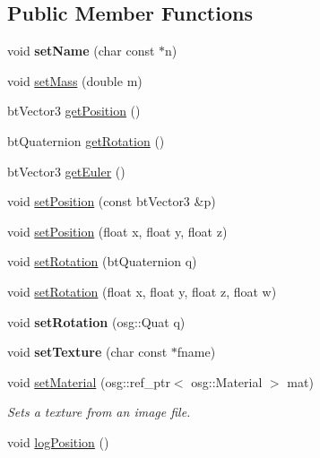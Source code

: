 \subsection*{Public Member Functions}
\begin{DoxyCompactItemize}
\item 
\mbox{\label{classbtosgObject_ab06a1b3f357209214c6440cd5746523e}} 
void {\bfseries set\+Name} (char const $\ast$n)
\item 
void \hyperlink{classbtosgObject_a91da93c82d48b86192f0cbb16054fe57}{set\+Mass} (double m)
\item 
bt\+Vector3 \hyperlink{classbtosgObject_a77a1434498d7a6d00c415042a995d119}{get\+Position} ()
\item 
bt\+Quaternion \hyperlink{classbtosgObject_a9cadb03762699412552601196950a039}{get\+Rotation} ()
\item 
bt\+Vector3 \hyperlink{classbtosgObject_afef1fe06635566ab9cee134f72439e02}{get\+Euler} ()
\item 
void \hyperlink{classbtosgObject_ad0f76df8e8bde6c8a9d1b1d53551172b}{set\+Position} (const bt\+Vector3 \&p)
\item 
void \hyperlink{classbtosgObject_adb9f2cff0faf66dc252cd7c97b11ac84}{set\+Position} (float x, float y, float z)
\item 
void \hyperlink{classbtosgObject_a656412794a971a10478aedb520f298bf}{set\+Rotation} (bt\+Quaternion q)
\item 
void \hyperlink{classbtosgObject_a4d21ca59b944fd26644db35d3e9ba67a}{set\+Rotation} (float x, float y, float z, float w)
\item 
\mbox{\label{classbtosgObject_ae803e0566f0d7b3ffca686b968b297f8}} 
void {\bfseries set\+Rotation} (osg\+::\+Quat q)
\item 
\mbox{\label{classbtosgObject_aff54acbc7c66811efb0cf2838107a241}} 
void {\bfseries set\+Texture} (char const $\ast$fname)
\item 
void \hyperlink{classbtosgObject_a6ab7b9e0553dab398b980637788b56a8}{set\+Material} (osg\+::ref\+\_\+ptr$<$ osg\+::\+Material $>$ mat)
\begin{DoxyCompactList}\small\item\em Sets a texture from an image file. \end{DoxyCompactList}\item 
void \hyperlink{classbtosgObject_acfd70fa6477c80fd7f29ad7ab9f4f067}{log\+Position} ()

\end{DoxyCompactItemize}
